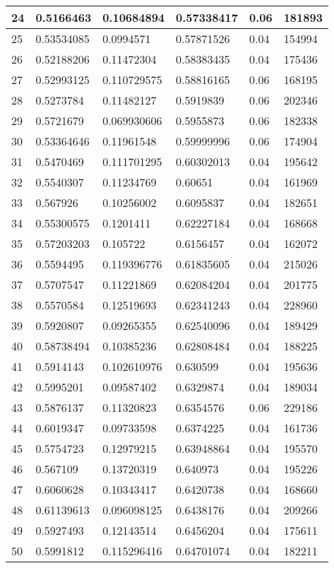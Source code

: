 \begin{longtable}{|l|l|l|l|l|l|}
24 & 0.5166463 & 0.10684894 & 0.57338417 & 0.06 & 181893 \\ \hline 
25 & 0.53534085 & 0.0994571 & 0.57871526 & 0.04 & 154994 \\ \hline 
26 & 0.52188206 & 0.11472304 & 0.58383435 & 0.04 & 175436 \\ \hline 
27 & 0.52993125 & 0.110729575 & 0.58816165 & 0.06 & 168195 \\ \hline 
28 & 0.5273784 & 0.11482127 & 0.5919839 & 0.06 & 202346 \\ \hline 
29 & 0.5721679 & 0.069930606 & 0.5955873 & 0.06 & 182338 \\ \hline 
30 & 0.53364646 & 0.11961548 & 0.59999996 & 0.06 & 174904 \\ \hline 
31 & 0.5470469 & 0.111701295 & 0.60302013 & 0.04 & 195642 \\ \hline 
32 & 0.5540307 & 0.11234769 & 0.60651 & 0.04 & 161969 \\ \hline 
33 & 0.567926 & 0.10256002 & 0.6095837 & 0.04 & 182651 \\ \hline 
34 & 0.55300575 & 0.1201411 & 0.62227184 & 0.04 & 168668 \\ \hline 
35 & 0.57203203 & 0.105722 & 0.6156457 & 0.04 & 162072 \\ \hline 
36 & 0.5594495 & 0.119396776 & 0.61835605 & 0.04 & 215026 \\ \hline 
37 & 0.5707547 & 0.11221869 & 0.62084204 & 0.04 & 201775 \\ \hline 
38 & 0.5570584 & 0.12519693 & 0.62341243 & 0.04 & 228960 \\ \hline 
39 & 0.5920807 & 0.09265355 & 0.62540096 & 0.04 & 189429 \\ \hline 
40 & 0.58738494 & 0.10385236 & 0.62808484 & 0.04 & 188225 \\ \hline 
41 & 0.5914143 & 0.102610976 & 0.630599 & 0.04 & 195636 \\ \hline 
42 & 0.5995201 & 0.09587402 & 0.6329874 & 0.04 & 189034 \\ \hline 
43 & 0.5876137 & 0.11320823 & 0.6354576 & 0.06 & 229186 \\ \hline 
44 & 0.6019347 & 0.09733598 & 0.6374225 & 0.04 & 161736 \\ \hline 
45 & 0.5754723 & 0.12979215 & 0.63948864 & 0.04 & 195570 \\ \hline 
46 & 0.567109 & 0.13720319 & 0.640973 & 0.04 & 195226 \\ \hline 
47 & 0.6060628 & 0.10343417 & 0.6420738 & 0.04 & 168660 \\ \hline 
48 & 0.61139613 & 0.096098125 & 0.6438176 & 0.04 & 209266 \\ \hline 
49 & 0.5927493 & 0.12143514 & 0.6456204 & 0.04 & 175611 \\ \hline 
50 & 0.5991812 & 0.115296416 & 0.64701074 & 0.04 & 182211 \\ \hline 
\end{longtable}
